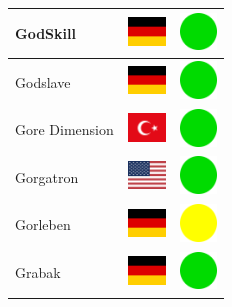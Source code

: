 \documentclass[12pt, a4paper, twoside]{report}
\begin{document}
\begin{center}
\begin{longtable}{|p{5cm}|p{2cm}|p{2cm}|}
 GodSkill                                                   & \includegraphics[width=1cm]{4x3/de} &   \includegraphics[width=1cm]{likes/y} \\ \hline
 Godslave                                                   & \includegraphics[width=1cm]{4x3/de} &   \includegraphics[width=1cm]{likes/y} \\ \hline
 Gore Dimension                                             & \includegraphics[width=1cm]{4x3/tr} &   \includegraphics[width=1cm]{likes/y} \\ \hline
 Gorgatron                                                  & \includegraphics[width=1cm]{4x3/us} &   \includegraphics[width=1cm]{likes/y} \\ \hline
 Gorleben                                                   & \includegraphics[width=1cm]{4x3/de} &   \includegraphics[width=1cm]{likes/m} \\ \hline
 Grabak                                                     & \includegraphics[width=1cm]{4x3/de} &   \includegraphics[width=1cm]{likes/y} \\ \hline

\end{longtable}
\end{center}
\end{document}
